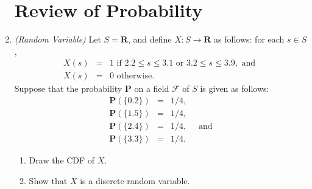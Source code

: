 \documentclass[11pt]{article}
\begin{document}
\begin{enumerate}
	\section*{Review of Probability}

	\item \textit{(Random Variable)} Let $S=\mathbf{R}$, and define $X:S\rightarrow \mathbf{R}$ as follows: for each $s \in S$,
	\begin{eqnarray*}
		X(s) &=&1\text{ if }2.2\leq s\leq 3.1\text{ or }3.2\leq s\leq 3.9, \text{ and } \\
		X(s) &=&0\text{ otherwise.}
	\end{eqnarray*}%
	Suppose that the probability $\mathbf{P}$ on a field $\mathcal{F}$ of $S$ is given as follows:%
	\begin{eqnarray*}
		\mathbf{P}(\{0.2\}) &=&1/4, \\
		\mathbf{P}(\{1.5\}) &=&1/4,\\
		\mathbf{P}(\{2.4\}) &=&1/4,\quad\text{ and} \\
		\mathbf{P}(\{3.3\}) &=&1/4.
	\end{eqnarray*}%
	\begin{enumerate}
	\item  Draw the CDF of $X$.

	\item Show that $X$ is a discrete random variable.


\end{enumerate}
\end{enumerate}
\end{document}
